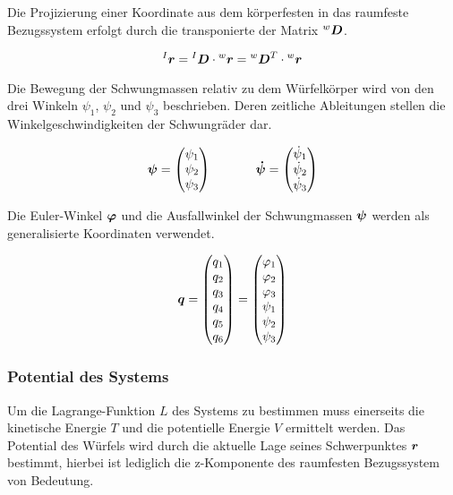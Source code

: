 Die Projizierung einer Koordinate aus dem körperfesten in das raumfeste Bezugssystem erfolgt durch die transponierte der Matrix $\prescript{w}{}{}\boldsymbol{D}$.

\begin{equation}
\prescript{I}{}{}\boldsymbol{r} = \prescript{I}{}{}\boldsymbol{D} \cdot \prescript{w}{}{}\boldsymbol{r} = \prescript{w}{}{}\boldsymbol{D}^T \cdot  \prescript{w}{}{}\boldsymbol{r}
\end{equation} 

Die Bewegung der Schwungmassen relativ zu dem Würfelkörper wird von den drei Winkeln $\psi_1$, $\psi_2$ und $\psi_3$ beschrieben. Deren zeitliche Ableitungen stellen die Winkelgeschwindigkeiten der Schwungräder dar. 

\begin{equation}
\boldsymbol{\psi} = \begin{pmatrix}
{\psi}_1 \\
{\psi}_2  \\
{\psi}_3 
\end{pmatrix}
\hspace{35pt}
\boldsymbol{\dot{\psi}} = \begin{pmatrix}
\dot{\psi}_1 \\
\dot{\psi}_2  \\
\dot{\psi}_3 
\end{pmatrix}
\end{equation}

Die Euler-Winkel $\boldsymbol{\varphi}$ und die Ausfallwinkel der Schwungmassen $\boldsymbol{\psi}$ werden als generalisierte Koordinaten verwendet.

\begin{equation}
\boldsymbol{q} = \begin{pmatrix}
q_1 \\ q_2 \\ q_3 \\ q_4 \\ q_5 \\ q_6
\end{pmatrix} =
\begin{pmatrix}
\varphi_1 \\ \varphi_2 \\ \varphi_3 \\ \psi_1 \\ \psi_2 \\ \psi_3
\end{pmatrix}
\end{equation}

\subsubsection{Potential des Systems}
Um die Lagrange-Funktion $L$ des Systems zu bestimmen muss einerseits die kinetische Energie $T$ und die potentielle Energie $V$ ermittelt werden. Das Potential des Würfels wird durch die aktuelle Lage seines Schwerpunktes $\boldsymbol{r}$ bestimmt, hierbei ist lediglich die z-Komponente des raumfesten Bezugssystem von Bedeutung.

